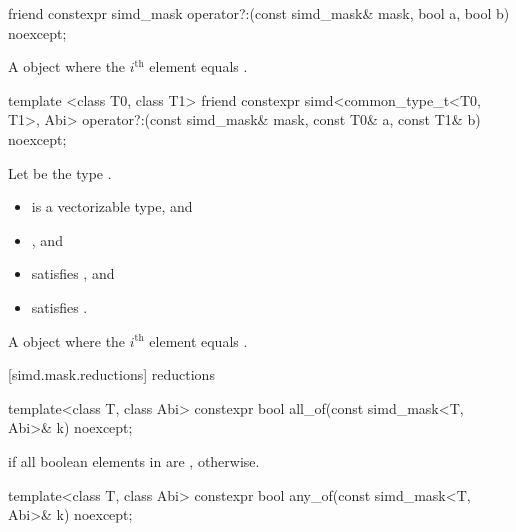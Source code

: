 \begin{itemdecl}
friend constexpr simd_mask operator?:(const simd_mask& mask, bool a, bool b) noexcept;
\end{itemdecl}

\begin{itemdescr}
  \pnum\returns
  A  object where the $i^\text{th}$ element equals  \foralli.
\end{itemdescr}

\begin{itemdecl}
template <class T0, class T1>
  friend constexpr simd<common_type_t<T0, T1>, Abi>
    operator?:(const simd_mask& mask, const T0& a, const T1& b) noexcept;
\end{itemdecl}

\begin{itemdescr}
  \pnum Let  be the type .
  \pnum\constraints
  \begin{itemize}
    \item {} is a vectorizable type, and
    \item {}, and
    \item {} satisfies , and
    \item {} satisfies .
  \end{itemize}

  \pnum\returns
  A  object where the $i^\text{th}$ element equals  \foralli.
\end{itemdescr}

[simd.mask.reductions]{\texorpdfstring{ reductions}{simd_mask reductions}}

\begin{itemdecl}
template<class T, class Abi> constexpr bool all_of(const simd_mask<T, Abi>& k) noexcept;
\end{itemdecl}

\begin{itemdescr}
  \pnum\returns
   if all boolean elements in  are ,  otherwise.
\end{itemdescr}

\begin{itemdecl}
template<class T, class Abi> constexpr bool any_of(const simd_mask<T, Abi>& k) noexcept;
\end{itemdecl}

